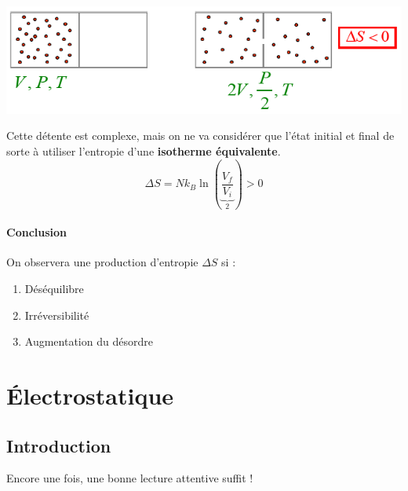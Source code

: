 \documentclass	[11pt, a4paper, openany]{book}
\begin{document}
\begin{center}
	\includegraphics[scale=0.7]{th/image21.png}
\end{center}
Cette détente est complexe, mais on ne va considérer que l'état initial et final de sorte à utiliser l'entropie d'une \textbf{isotherme équivalente}.
\begin{equation}
	\Delta S = Nk_B\ln\left(\underbrace{\frac{V_f}{V_i}}_{2}\right) > 0
\end{equation}
\subsubsection{Conclusion}
On observera une production d'entropie $\Delta S$ si :
\begin{enumerate}
	\item Déséquilibre
	\item Irréversibilité
	\item Augmentation du désordre
\end{enumerate}
\begin{center}
\end{center}
























\chapter{Électrostatique}
\section{Introduction}
Encore une fois, une bonne lecture attentive suffit !
\end{document}
